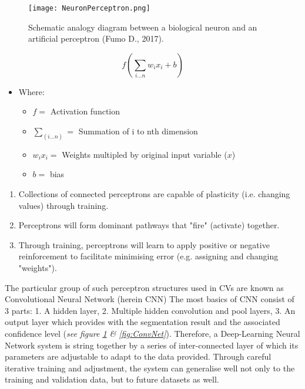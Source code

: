 \documentclass[11pt, a4paper, twoside]{report}
\begin{document}
\begin{figure}[H]
\centering
\texttt{[image: NeuronPerceptron.png]}
  \caption{Schematic analogy diagram between a biological neuron and an artificial perceptron (Fumo D., 2017).}
\label{fig:NeuronPerceptron}
\end{figure}

\begin{equation}
  \label{weights&bias}
  f(\sum_{i ... n} w_{i} x_{i} + b)
\end{equation}

\begin{itemize}
  \item Where:
    \begin{itemize}
      \item $f =$ Activation function
      \item $\sum_{(i ... n)} =$ Summation of i to nth dimension
      \item $w_{i} x_{i} =$ Weights multipled by original input variable ($x$)
      \item $b =$ bias
    \end{itemize}
\end{itemize}

\begin{enumerate}
  \item Collections of connected perceptrons are capable of plasticity (i.e. changing values) through training.
  \item Perceptrons will form dominant pathways that "fire" (activate) together.
  \item Through training, perceptrons will learn to apply positive or negative reinforcement to facilitate minimising error (e.g. assigning and changing "weights").
\end{enumerate}

The particular group of such perceptron structures used in CVs are known as Convolutional Neural Network (herein CNN) The most basics of CNN consist of 3 parts: 1. A hidden layer, 2. Multiple hidden convolution and pool layers, 3. An output layer which provides with the segmentation result and the associated confidence level (\textit{see figure \ref{fig:NeuronPerceptron} & \ref{fig:ConvNet}}). Therefore, a Deep-Learning Neural Network system is string together by a series of inter-connected layer of which its parameters are adjustable to adapt to the data provided. Through careful iterative training and adjustment, the system can generalise well not only to the training and validation data, but to future datasets as well.\\\par
\end{document}
